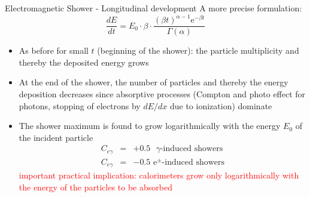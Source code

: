 \documentclass[style=husky,clock,size=9pt,dvipsnames]{powerdot}
\newcommand\myred{\textcolor{Red}} %
\begin{document}
\begin{slide}[trans=Fly,toc=]{Electromagnetic Shower - Longitudinal development}
	A more precise formulation:
	\begin{equation}
		\frac{dE}{dt}=E_0\cdot\beta\cdot\frac{(\beta t)^{\alpha-1}\mbox{e}^{-\beta t}}{\Gamma(\alpha)}
	\end{equation}
	\begin{itemize}
		\item As before for small $t$ (beginning of the shower): the particle multiplicity and thereby the deposited energy grows
		\item At the end of the shower, the number of particles and thereby the energy deposition decreases since absorptive processes (Compton and photo effect for photons, stopping of electrons by $dE/dx$ due to ionization) dominate
		\item The shower maximum is found to grow logarithmically with the energy $E_0$ of the incident particle
		{
			\begin{eqnarray*}
				C_{e\gamma} & = & +0.5\mbox{ $\gamma$-induced showers}\\
				C_{e\gamma} & = & -0.5\mbox{ e$^\pm$-induced showers}
			\end{eqnarray*}
		}
		\myred{important practical implication: calorimeters grow only logarithmically with the energy of the particles to be absorbed}
	\end{itemize}
\end{slide}
\end{document}
